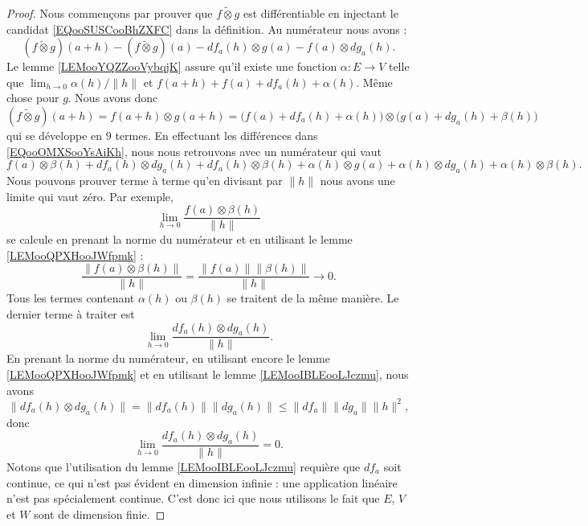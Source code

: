 \begin{proof}
    Nous commençons par prouver que \( f\tilde\otimes g\) est différentiable en injectant le candidat \eqref{EQooSUSCooBhZXFC} dans la définition. Au numérateur nous avons :
    \begin{equation}        \label{EQooOMXSooYsAiKh}
        (f\tilde\otimes g)(a+h)-(f\tilde\otimes g)(a)-df_a(h)\otimes g(a)-f(a)\otimes dg_a(h).
    \end{equation}
    Le lemme \ref{LEMooYQZZooVybqjK} assure qu'il existe une fonction \( \alpha\colon E\to V\) telle que \( \lim_{h\to 0} \alpha(h)/\| h \|\) et \( f(a+h)+f(a)+df_a(h)+\alpha(h)\). Même chose pour \( g\). Nous avons donc
    \begin{equation}
        (f\tilde\otimes g)(a+h)=f(a+h)\otimes g(a+h)=\big( f(a)+df_a(h)+\alpha(h) \big)\otimes \big( g(a)+dg_a(h)+\beta(h) \big)
    \end{equation}
    qui se développe en \( 9\) termes. En effectuant les différences dans \eqref{EQooOMXSooYsAiKh}, nous nous retrouvons avec un numérateur qui vaut
    \begin{equation}
        f(a)\otimes \beta(h)+df_a(h)\otimes dg_a(h)+df_a(h)\otimes \beta(h)+\alpha(h)\otimes g(a)+\alpha(h)\otimes dg_a(h)+\alpha(h)\otimes \beta(h).
    \end{equation}
    Nous pouvons prouver terme à terme qu'en divisant par \( \| h \|\) nous avons une limite qui vaut zéro. Par exemple,
    \begin{equation}
        \lim_{h\to 0} \frac{ f(a)\otimes \beta(h) }{ \| h \| }
    \end{equation}
    se calcule en prenant la norme du numérateur et en utilisant le lemme \ref{LEMooQPXHooJWfpmk} :
    \begin{equation}
        \frac{ \| f(a)\otimes \beta(h) \| }{ \| h \| }=\frac{ \| f(a) \|\| \beta(h) \| }{ \| h \| }\to 0.
    \end{equation}
    Tous les termes contenant \( \alpha(h)\) ou \( \beta(h)\) se traitent de la même manière. Le dernier terme à traiter est
    \begin{equation}
        \lim_{h\to 0} \frac{ df_a(h)\otimes dg_a(h) }{ \| h \| }.
    \end{equation}
    En prenant la norme du numérateur, en utilisant encore le lemme \ref{LEMooQPXHooJWfpmk} et en utilisant le lemme \ref{LEMooIBLEooLJczmu}, nous avons
    \begin{equation}
        \| df_a(h)\otimes dg_a(h) \|=\| df_a(h) \|\| dg_a(h) \|\leq \| df_a \|\| dg_a \|\| h \|^2,
    \end{equation}
    donc
    \begin{equation}
        \lim_{h\to 0} \frac{ df_a(h)\otimes dg_a(h) }{ \| h \| }=0.
    \end{equation}
    Notons que l'utilisation du lemme \ref{LEMooIBLEooLJczmu} requière que \( df_a\) soit continue, ce qui n'est pas évident en dimension infinie : une application linéaire n'est pas spécialement continue. C'est donc ici que nous utilisons le fait que \( E\), \( V\) et \( W\) sont de dimension finie.


\end{proof}
